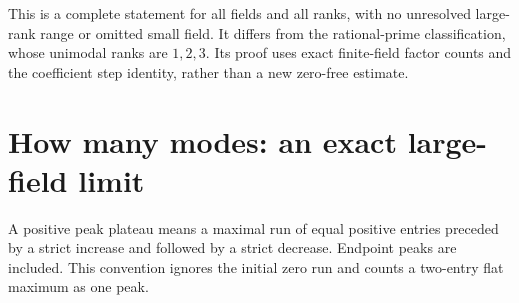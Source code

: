 \documentclass[11pt]{article}
\begin{document}
This is a complete statement for all fields and all ranks, with no
unresolved large-rank range or omitted small field. It differs from
the rational-prime classification, whose unimodal ranks are
\(1,2,3\). Its proof uses exact finite-field factor counts and the
coefficient step identity, rather than a new zero-free estimate.

\section{How many modes: an exact large-field limit}

A positive peak plateau means a maximal run of equal positive entries
preceded by a strict increase and followed by a strict decrease.
Endpoint peaks are included. This convention ignores the initial
zero run and counts a two-entry flat maximum as one peak.
\end{document}

